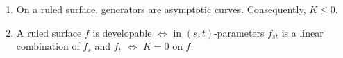 \begin{proposition}[3.7.5]
\leavevmode
\begin{enumerate}
\item[(i)] On a ruled surface, generators are asymptotic curves. Consequently, $K \leq 0$.
\item[(ii)] A ruled surface $f$ is developable $\Leftrightarrow$ in $(s, t)$-parameters $f_{st}$ is a linear combination of $f_s$ and $f_t$ $\Leftrightarrow$ $K = 0$ on $f$.
\end{enumerate}
\end{proposition}
